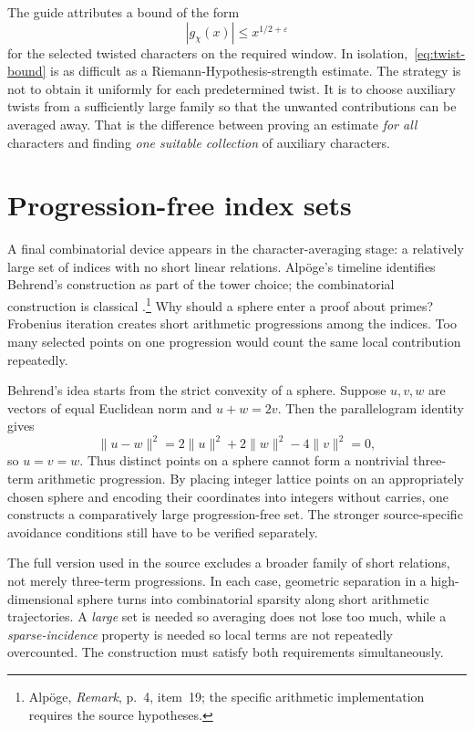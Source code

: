 \documentclass[11pt,openany,oneside]{scrbook}
\theoremstyle{definition}
\theoremstyle{remark}
\newcommand{\eps}{\varepsilon}
\begin{document}
The guide attributes a bound of the form
\begin{equation}\label{eq:twist-bound}
|g_\chi(x)|\le x^{1/2+\eps}
\end{equation}
for the selected twisted characters on the required window. In isolation,~\eqref{eq:twist-bound} is as difficult as a Riemann-Hypothesis-strength estimate. The strategy is not to obtain it uniformly for each predetermined twist. It is to choose auxiliary twists from a sufficiently large family so that the unwanted contributions can be averaged away. That is the difference between proving an estimate \emph{for all} characters and finding \emph{one suitable collection} of auxiliary characters.

\section{Progression-free index sets}

A final combinatorial device appears in the character-averaging stage: a relatively large set of indices with no short linear relations. Alp\"oge's timeline identifies Behrend's construction as part of the tower choice; the combinatorial construction is classical \parencite{Behrend1946}.\footnote{Alp\"oge, \emph{Remark}, p.~4, item~19; the specific arithmetic implementation requires the source hypotheses.} Why should a sphere enter a proof about primes? Frobenius iteration creates short arithmetic progressions among the indices. Too many selected points on one progression would count the same local contribution repeatedly.

Behrend's idea starts from the strict convexity of a sphere. Suppose $u,v,w$ are vectors of equal Euclidean norm and $u+w=2v$. Then the parallelogram identity gives
\[
\|u-w\|^2=2\|u\|^2+2\|w\|^2-4\|v\|^2=0,
\]
so $u=v=w$. Thus distinct points on a sphere cannot form a nontrivial three-term arithmetic progression. By placing integer lattice points on an appropriately chosen sphere and encoding their coordinates into integers without carries, one constructs a comparatively large progression-free set. The stronger source-specific avoidance conditions still have to be verified separately.

The full version used in the source excludes a broader family of short relations, not merely three-term progressions. In each case, geometric separation in a high-dimensional sphere turns into combinatorial sparsity along short arithmetic trajectories. A \emph{large} set is needed so averaging does not lose too much, while a \emph{sparse-incidence} property is needed so local terms are not repeatedly overcounted. The construction must satisfy both requirements simultaneously.
\end{document}
